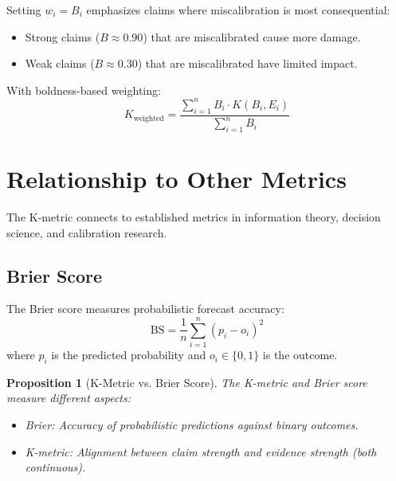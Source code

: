 \documentclass[11pt,a4paper]{article}
\newtheorem{proposition}[theorem]{Proposition}
\theoremstyle{remark}
\begin{document}
\begin{keyinsight}[title={Recommended Default: Boldness-Based Weighting}]
Setting $w_i = B_i$ emphasizes claims where miscalibration is most consequential:
\begin{itemize}
    \item Strong claims ($B \approx 0.90$) that are miscalibrated cause more damage.
    \item Weak claims ($B \approx 0.30$) that are miscalibrated have limited impact.
\end{itemize}

With boldness-based weighting:
\begin{equation}
K_{\text{weighted}} = \frac{\sum_{i=1}^{n} B_i \cdot K(B_i, E_i)}{\sum_{i=1}^{n} B_i}
\end{equation}
\end{keyinsight}


\section{Relationship to Other Metrics}
\label{sec:related}

The K-metric connects to established metrics in information theory, decision science, and calibration research.

\subsection{Brier Score}

The Brier score \citep{Brier1950} measures probabilistic forecast accuracy:
\begin{equation}
\text{BS} = \frac{1}{n} \sum_{i=1}^{n} (p_i - o_i)^2
\end{equation}
where $p_i$ is the predicted probability and $o_i \in \{0, 1\}$ is the outcome.

\begin{proposition}[K-Metric vs. Brier Score]
\label{prop:brier}
The K-metric and Brier score measure different aspects:
\begin{itemize}
    \item Brier: Accuracy of probabilistic predictions against binary outcomes.
    \item K-metric: Alignment between claim strength and evidence strength (both continuous).
\end{itemize}
\end{proposition}
\end{document}
